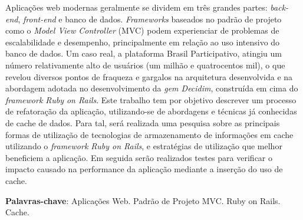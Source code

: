 \begin{resumo}
  Aplicações web modernas geralmente se dividem em três grandes partes: \textit{back-end}, \textit{front-end} e banco de dados. \textit{Frameworks} baseados no padrão de projeto como o \textit{Model View Controller} (MVC) podem experienciar de problemas de escalabilidade e desempenho, principalmente em relação ao uso intensivo do banco de dados. Um caso real, a plataforma Brasil Participativo, atingiu um número relativamente alto de usuários (um milhão e quatrocentos mil), o que revelou diversos pontos de fraqueza e gargalos na arquitetura desenvolvida e na abordagem adotada no desenvolvimento da \textit{gem Decidim}, construída em cima do \textit{framework Ruby on Rails}. Este trabalho tem por objetivo descrever um processo de refatoração da aplicação, utilizando-se de abordagens e técnicas já conhecidas de cache de dados. Para tal, será realizada uma pesquisa sobre as principais formas de utilização de tecnologias de armazenamento de informações em cache utilizando o \textit{framework Ruby on Rails}, e estratégias de utilização que melhor beneficiem a aplicação. Em seguida serão realizados testes para verificar o impacto causado na performance da aplicação mediante a inserção do uso de cache.

   \vspace{\onelineskip}

   \noindent
   \textbf{Palavras-chave}: Aplicações Web. Padrão de Projeto MVC. Ruby on Rails. Cache.
  \end{resumo}

